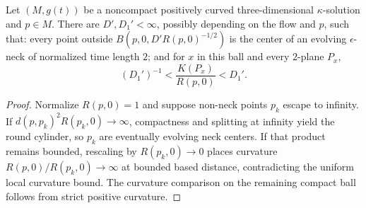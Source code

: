 \begin{lemma}\label{lem:noncompact-kappa-solution-neck-structure}

Let $(M,g(t))$ be a noncompact positively curved
three-dimensional $\kappa$-solution and $p\in M$. There are
$D',D_1'<\infty$, possibly depending on the flow and $p$, such that:
every point outside
$B(p,0,D'R(p,0)^{-1/2})$ is the center of an evolving
$\epsilon$-neck of normalized time length $2$; and for
$x$ in this ball and every $2$-plane $P_x$,
\[
 (D_1')^{-1}<\frac{K(P_x)}{R(p,0)}<D_1'.
\]
\end{lemma}
\begin{proof}
\sketch
{}
Normalize $R(p,0)=1$ and suppose non-neck points $p_k$ escape to
infinity. If $d(p,p_k)^2R(p_k,0)\to\infty$, compactness and splitting
at infinity yield the round cylinder, so $p_k$ are eventually
evolving neck centers. If that product remains bounded, rescaling by
$R(p_k,0)\to0$ places curvature $R(p,0)/R(p_k,0)\to\infty$ at
bounded based distance, contradicting the uniform local curvature
bound. The curvature comparison on the remaining compact ball
follows from strict positive curvature.
\end{proof}

